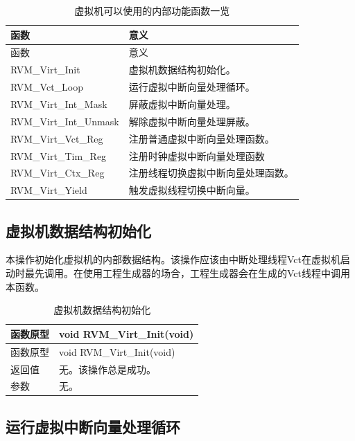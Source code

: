 \begin{xltabular}{\textwidth}{@{}>{\hsize\raggedright\arraybackslash}X>{\hsize\raggedright\arraybackslash}X@{}}
\caption{虚拟机可以使用的内部功能函数一览}\label{tab:4-18}\\
\toprule
函数 & 意义\tabularnewline
\endfirsthead
\toprule
函数 & 意义\tabularnewline
\midrule
\endhead
\bottomrule
\endlastfoot
RVM\_\allowbreak{}Virt\_\allowbreak{}Init & 虚拟机数据结构初始化。\tabularnewline
RVM\_\allowbreak{}Vct\_\allowbreak{}Loop & 运行虚拟中断向量处理循环。\tabularnewline
RVM\_\allowbreak{}Virt\_\allowbreak{}Int\_\allowbreak{}Mask & 屏蔽虚拟中断向量处理。\tabularnewline
RVM\_\allowbreak{}Virt\_\allowbreak{}Int\_\allowbreak{}Unmask & 解除虚拟中断向量处理屏蔽。\tabularnewline
RVM\_\allowbreak{}Virt\_\allowbreak{}Vct\_\allowbreak{}Reg & 注册普通虚拟中断向量处理函数。\tabularnewline
RVM\_\allowbreak{}Virt\_\allowbreak{}Tim\_\allowbreak{}Reg & 注册时钟虚拟中断向量处理函数\tabularnewline
RVM\_\allowbreak{}Virt\_\allowbreak{}Ctx\_\allowbreak{}Reg & 注册线程切换虚拟中断向量处理函数。\tabularnewline
RVM\_\allowbreak{}Virt\_\allowbreak{}Yield & 触发虚拟线程切换中断向量。\tabularnewline
\end{xltabular}

\subsection{虚拟机数据结构初始化}\label{subsec:4-5-1}

本操作初始化虚拟机的内部数据结构。该操作应该由中断处理线程Vct在虚拟机启动时最先调用。在使用工程生成器的场合，工程生成器会在生成的Vct线程中调用本函数。

\begin{xltabular}{\textwidth}{@{}>{\hsize\raggedright\arraybackslash}X>{\hsize\raggedright\arraybackslash}X@{}}
\caption{虚拟机数据结构初始化}\label{tab:4-19}\\
\toprule
函数原型 & void RVM\_\allowbreak{}Virt\_\allowbreak{}Init(void)\tabularnewline
\endfirsthead
\toprule
函数原型 & void RVM\_\allowbreak{}Virt\_\allowbreak{}Init(void)\tabularnewline
\midrule
\endhead
\bottomrule
\endlastfoot
返回值 & 无。该操作总是成功。\tabularnewline
参数 & 无。\tabularnewline
\end{xltabular}

\subsection{运行虚拟中断向量处理循环}\label{subsec:4-5-2}

